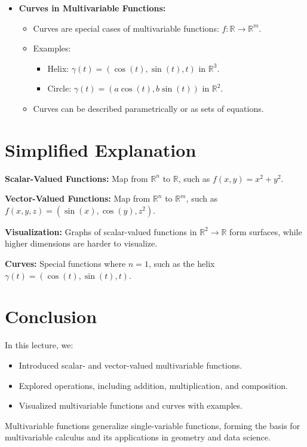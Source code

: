 \documentclass{article}
\begin{document}
\begin{itemize}
  \item \textbf{Curves in Multivariable Functions:}
    \begin{itemize}
      \item Curves are special cases of multivariable functions: $f: \mathbb{R} \to \mathbb{R}^m$.
      \item Examples:
        \begin{itemize}
          \item Helix: $\gamma(t) = (\cos(t), \sin(t), t)$ in $\mathbb{R}^3$.
          \item Circle: $\gamma(t) = (a \cos(t), b \sin(t))$ in $\mathbb{R}^2$.
        \end{itemize}
      \item Curves can be described parametrically or as sets of equations.
    \end{itemize}
\end{itemize}

\section*{Simplified Explanation}

\textbf{Scalar-Valued Functions:}
Map from $\mathbb{R}^n$ to $\mathbb{R}$, such as $f(x, y) = x^2 + y^2$.

\textbf{Vector-Valued Functions:}
Map from $\mathbb{R}^n$ to $\mathbb{R}^m$, such as $f(x, y, z) = (\sin(x), \cos(y), z^2)$.

\textbf{Visualization:}
Graphs of scalar-valued functions in $\mathbb{R}^2 \to \mathbb{R}$ form surfaces, while higher dimensions are harder to visualize.

\textbf{Curves:}
Special functions where $n = 1$, such as the helix $\gamma(t) = (\cos(t), \sin(t), t)$.

\section*{Conclusion}

In this lecture, we:
\begin{itemize}
  \item Introduced scalar- and vector-valued multivariable functions.
  \item Explored operations, including addition, multiplication, and composition.
  \item Visualized multivariable functions and curves with examples.
\end{itemize}

Multivariable functions generalize single-variable functions, forming the basis for multivariable calculus and its applications in geometry and data science.
\end{document}
